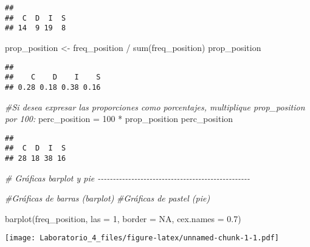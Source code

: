 \documentclass[
]{article}
\newenvironment{Shaded}{\begin{snugshade}}{\end{snugshade}}
\newcommand{\AttributeTok}[1]{\textcolor[rgb]{0.77,0.63,0.00}{#1}}
\newcommand{\CommentTok}[1]{\textcolor[rgb]{0.56,0.35,0.01}{\textit{#1}}}
\newcommand{\ConstantTok}[1]{\textcolor[rgb]{0.00,0.00,0.00}{#1}}
\newcommand{\DecValTok}[1]{\textcolor[rgb]{0.00,0.00,0.81}{#1}}
\newcommand{\FloatTok}[1]{\textcolor[rgb]{0.00,0.00,0.81}{#1}}
\newcommand{\FunctionTok}[1]{\textcolor[rgb]{0.00,0.00,0.00}{#1}}
\newcommand{\NormalTok}[1]{#1}
\newcommand{\OtherTok}[1]{\textcolor[rgb]{0.56,0.35,0.01}{#1}}
\newcommand{\SpecialCharTok}[1]{\textcolor[rgb]{0.00,0.00,0.00}{#1}}
\begin{document}
\begin{verbatim}
## 
##  C  D  I  S 
## 14  9 19  8
\end{verbatim}

\begin{Shaded}
\begin{Highlighting}[]
\NormalTok{prop\_position }\OtherTok{\textless{}{-}}\NormalTok{ freq\_position }\SpecialCharTok{/} \FunctionTok{sum}\NormalTok{(freq\_position)}
\NormalTok{prop\_position}
\end{Highlighting}
\end{Shaded}

\begin{verbatim}
## 
##    C    D    I    S 
## 0.28 0.18 0.38 0.16
\end{verbatim}

\begin{Shaded}
\begin{Highlighting}[]
\CommentTok{\#Si desea expresar las proporciones como porcentajes, multiplique prop\_position por 100:}
\NormalTok{perc\_position }\OtherTok{=} \DecValTok{100} \SpecialCharTok{*}\NormalTok{ prop\_position}
\NormalTok{perc\_position}
\end{Highlighting}
\end{Shaded}

\begin{verbatim}
## 
##  C  D  I  S 
## 28 18 38 16
\end{verbatim}

\begin{Shaded}
\begin{Highlighting}[]
\CommentTok{\# Gráficas barplot y pie {-}{-}{-}{-}{-}{-}{-}{-}{-}{-}{-}{-}{-}{-}{-}{-}{-}{-}{-}{-}{-}{-}{-}{-}{-}{-}{-}{-}{-}{-}{-}{-}{-}{-}{-}{-}{-}{-}{-}{-}{-}{-}{-}{-}{-}{-}{-}{-}{-}{-}}

\CommentTok{\#Gráficas de barras (barplot)}
\CommentTok{\#Gráficas de pastel (pie)}

\FunctionTok{barplot}\NormalTok{(freq\_position, }\AttributeTok{las =} \DecValTok{1}\NormalTok{, }\AttributeTok{border =} \ConstantTok{NA}\NormalTok{, }\AttributeTok{cex.names =} \FloatTok{0.7}\NormalTok{)}
\end{Highlighting}
\end{Shaded}

\texttt{[image: Laboratorio\_4\_files/figure-latex/unnamed-chunk-1-1.pdf]}
\end{document}
